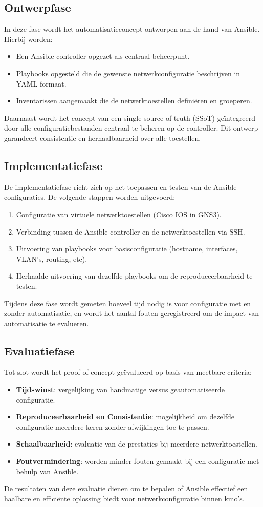 \subsection{Ontwerpfase}
In deze fase wordt het automatisatieconcept ontworpen aan de hand van Ansible. Hierbij worden:
\begin{itemize}
  \item Een Ansible controller opgezet als centraal beheerpunt.
  \item Playbooks opgesteld die de gewenste netwerkconfiguratie beschrijven in YAML-formaat.
  \item Inventarissen aangemaakt die de netwerktoestellen definiëren en groeperen.
\end{itemize}
Daarnaast wordt het concept van een single source of truth (SSoT) geïntegreerd door alle configuratiebestanden centraal te beheren op de controller. Dit ontwerp garandeert consistentie en herhaalbaarheid over alle toestellen.

\subsection{Implementatiefase}
De implementatiefase richt zich op het toepassen en testen van de Ansible-configuraties. De volgende stappen worden uitgevoerd:
\begin{enumerate}
  \item Configuratie van virtuele netwerktoestellen (Cisco IOS in GNS3).
  \item Verbinding tussen de Ansible controller en de netwerktoestellen via SSH.
  \item Uitvoering van playbooks voor basisconfiguratie (hostname, interfaces, VLAN's, routing, etc).
  \item Herhaalde uitvoering van dezelfde playbooks om de reproduceerbaarheid te testen.
\end{enumerate}
Tijdens deze fase wordt gemeten hoeveel tijd nodig is voor configuratie met en zonder automatisatie, en wordt het aantal fouten geregistreerd om de impact van automatisatie te evalueren.

\subsection{Evaluatiefase}
Tot slot wordt het proof-of-concept geëvalueerd op basis van meetbare criteria:
\begin{itemize}
  \item \textbf{Tijdswinst}: vergelijking van handmatige versus geautomatiseerde configuratie.
  \item \textbf{Reproduceerbaarheid en Consistentie}: mogelijkheid om dezelfde configuratie meerdere keren zonder afwijkingen toe te passen.
  \item \textbf{Schaalbaarheid}: evaluatie van de prestaties bij meerdere netwerktoestellen.
  \item \textbf{Foutvermindering}: worden minder fouten gemaakt bij een configuratie met behulp van Ansible.

\end{itemize}
De resultaten van deze evaluatie dienen om te bepalen of Ansible effectief een haalbare en efficiënte oplossing biedt voor netwerkconfiguratie binnen kmo's.

